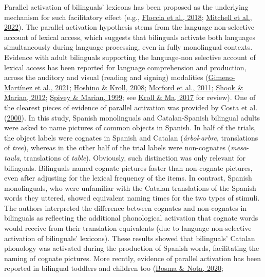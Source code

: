 \documentclass[
]{article}
\begin{document}
Parallel activation of bilinguals' lexicons has been proposed as the
underlying mechanism for such facilitatory effect (e.g.,
\protect\hyperlink{ref-floccia2018introduction}{Floccia et al., 2018};
\protect\hyperlink{ref-mitchell2022cognates}{Mitchell et al., 2022}).
The parallel activation hypothesis stems from the language non-selective
account of lexical access, which suggests that bilinguals activate both
languages simultaneously during language processing, even in fully
monolingual contexts. Evidence with adult bilinguals supporting the
language-non selective account of lexical access has been reported for
language comprehension and production, across the auditory and visual
(reading and signing) modalities
(\protect\hyperlink{ref-gimeno-martinez2021crosslinguistic}{Gimeno-Martínez
et al., 2021}; \protect\hyperlink{ref-hoshino2008cognate}{Hoshino \&
Kroll, 2008}; \protect\hyperlink{ref-morford2011when}{Morford et al.,
2011}; \protect\hyperlink{ref-shook2012bimodal}{Shook \& Marian, 2012};
\protect\hyperlink{ref-spivey1999cross}{Spivey \& Marian, 1999}; see
\protect\hyperlink{ref-kroll2017bilingual}{Kroll \& Ma, 2017} for
review). One of the clearest pieces of evidence of parallel activation
was provided by Costa et al.
(\protect\hyperlink{ref-costa2000cognate}{2000}). In this study, Spanish
monolinguals and Catalan-Spanish bilingual adults were asked to name
pictures of common objects in Spanish. In half of the trials, the object
labels were cognates in Spanish and Catalan (\emph{árbol}-\emph{arbre},
translations of \emph{tree}), whereas in the other half of the trial
labels were non-cognates (\emph{mesa}-\emph{taula}, translations of
\emph{table}). Obviously, such distinction was only relevant for
bilinguals. Bilinguals named cognate pictures faster than non-cognate
pictures, even after adjusting for the lexical frequency of the items.
In contrast, Spanish monolinguals, who were unfamiliar with the Catalan
translations of the Spanish words they uttered, showed equivalent naming
times for the two types of stimuli. The authors interpreted the
difference between cognates and non-cognates in bilinguals as reflecting
the additional phonological activation that cognate words would receive
from their translation equivalents (due to language non-selective
activation of bilinguals' lexicons). These results showed that
bilinguals' Catalan phonology was activated during the production of
Spanish words, facilitating the naming of cognate pictures. More
recntly, evidence of parallel activation has been reported in bilingual
toddlers and children too
(\protect\hyperlink{ref-bosma2020cognate}{Bosma \& Nota, 2020};
\end{document}
